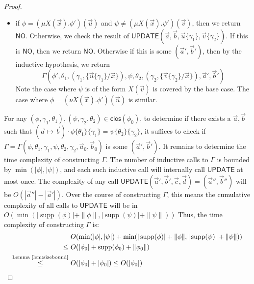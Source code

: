\documentclass[10pt,a4paper]{article}
\theoremstyle{definition}
\theoremstyle{remark}
\DeclareMathOperator{\supp}{supp}
\newcommand{\move}[2]{(#1\mapsto#2)}
\newcommand{\clos}[0]{\mathsf{clos}}
\newcommand\NO[0]{\mathsf{NO}}
\newcommand\update[0]{\mathsf{UPDATE}}
\begin{document}
\begin{proof}
\begin{itemize}
				\item if $\phi = (\mu X(\vec x).\phi')(\vec u)$ and $\psi \neq (\mu X(\vec x).\psi')(\vec v)$, then we return $\NO$.
		Otherwise, we check the result of $\update(\vec a, \vec b, \vec u\{\gamma_1\}, \vec v\{\gamma_2\})$. If this is $\NO$, then we return $\NO$. 
		Otherwise if this is some $(\vec a', \vec b')$, then 
		by the inductive hypothesis, we return $$\Gamma(\phi', \theta_1, (\gamma_1, \{\vec u\{\gamma_1\} / \vec x\}), \psi, \theta_2, (\gamma_2, \{\vec v\{\gamma_2\} / \vec x\}), \vec a', \vec b')$$
		Note the case where $\psi$ is of the form $X(\vec v)$ is covered by the base case.
		The case where $\phi = (\nu X(\vec x).\phi')(\vec u)$ is similar.
	\end{itemize}
	For any $(\phi, \gamma_1, \theta_1), (\psi, \gamma_2, \theta_2) \in \clos(\phi_0)$, to determine if there exists a $\vec a, \vec b$ such that $\move{\vec a}{\vec b}\cdot \phi\{\theta_1\}\{\gamma_1\} = \psi\{\theta_2\}\{\gamma_2\}$, it suffices to check if $\Gamma = \Gamma(\phi, \theta_1, \gamma_1, \psi, \theta_2, \gamma_2, \vec a_0, \vec b_0)$ is some $(\vec a', \vec b')$.
	It remains to determine the time complexity of constructing $\Gamma$.  
	The number of inductive calls to $\Gamma$ is bounded by $\min(|\phi|, |\psi|)$, and each such inductive call will internally call $\update$ at most once.
	The complexity of any call $\update(\vec a', \vec b', \vec c, \vec d) = (\vec a'', \vec b'')$ will be $O(|\vec a''| - |\vec a'|)$.  
	Over the course of constructing $\Gamma$, this means the cumulative complexity of all calls to $\update$ will be in $O(\min(|\supp(\phi)| + \|\phi\|, |\supp(\psi)| + \|\psi\|))$
	Thus, the time complexity of constructing $\Gamma$ is:
	\begin{align*}
		&O(\min(|\phi|, |\psi|) + \min(|\supp(\phi)| + \|\phi\|, |\supp(\psi)| + \|\psi\|)) \\
		\le\ &O(|\phi_0| + \supp(\phi_0) + \|\phi_0\|) \\
		\overset{\text{Lemma~\ref{lem:sizebound}}}{\le}\ &O(|\phi_0| + |\phi_0|) \le O(|\phi_0|)
	\end{align*} 
\end{proof}
\end{document}

